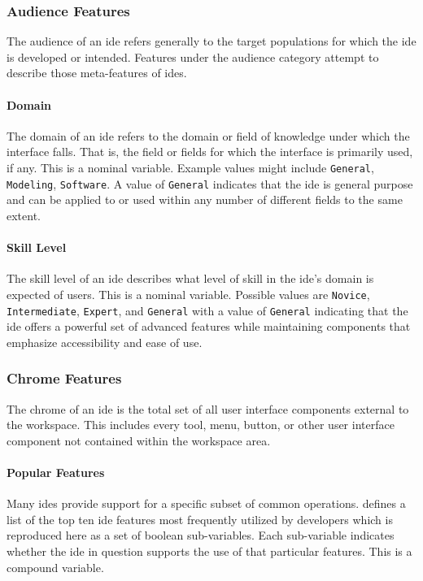 \subsubsection{Audience Features} \label{subsubsec:audience}

The audience of an \ac{ide} refers generally to the target populations for which
the \ac{ide} is developed or intended. Features under the audience category
attempt to describe those meta-features of \acp{ide}.


\paragraph{Domain} The domain of an \ac{ide} refers to the domain or field of
knowledge under which the interface falls. That is, the field or fields for
which the interface is primarily used, if any. This is a nominal variable.
Example values might include \texttt{General}, \texttt{Modeling},
\texttt{Software}. A value of \texttt{General} indicates that the \ac{ide} is
general purpose and can be applied to or used within any number of
different fields to the same extent.


\paragraph{Skill Level} The skill level of an \ac{ide} describes what level of
skill in the \ac{ide}'s domain is expected of users. This is a nominal variable.
Possible values are \texttt{Novice}, \texttt{Intermediate},
\texttt{Expert}, and \texttt{General} with a value of \texttt{General}
indicating that the \ac{ide} offers a powerful set of advanced features while
maintaining components that emphasize accessibility and ease of use.


\subsubsection{Chrome Features} \label{subsubsec:chrome}

The chrome of an \ac{ide} is the total set of all user interface components
external to the workspace. This includes every tool, menu, button, or other
user interface component not contained within the workspace area.


\paragraph{Popular Features} Many \acp{ide} provide support for a specific
subset of common operations. \citeauthor{murphy2006} defines a list of the
top ten \ac{ide} features most frequently utilized by developers which is
reproduced here as a set of boolean sub-variables. Each sub-variable
indicates whether the \ac{ide} in question supports the use of that particular
features. This is a compound variable.

